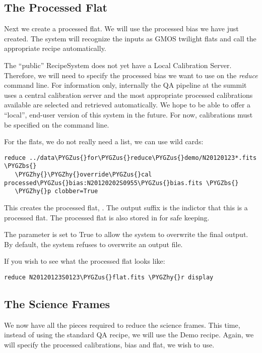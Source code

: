 \documentclass[letterpaper,10pt,english]{sphinxmanual}
\def\PYGZbs{\char`\\}
\def\PYGZus{\char`\_}
\def\PYGZhy{\char`\-}
\begin{document}
\subsection{The Processed Flat}
\label{appendices/appendix_demo:the-processed-flat}
Next we create a processed flat.  We will use the processed bias we have
just created.  The system will recognize the inputs as GMOS twilight flats and
call the appropriate recipe automatically.

The ``public'' RecipeSystem does not yet have a Local Calibration Server.  Therefore,
we will need to specify the processed bias we want to use on the \emph{reduce} command
line.  For information only, internally the QA pipeline at the summit uses a
central calibration server and the most appropriate processed calibrations available
are selected and retrieved automatically.  We hope to be able to offer a ``local'',
end-user version of this system in the future.  For now, calibrations must be
specified on the command line.

For the flats, we do not really need a list, we can use wild cards:

\begin{Verbatim}[commandchars=\\\{\}]
reduce ../data\PYGZus{}for\PYGZus{}reduce\PYGZus{}demo/N20120123*.fits \PYGZbs{}
   \PYGZhy{}\PYGZhy{}override\PYGZus{}cal processed\PYGZus{}bias:N20120202S0955\PYGZus{}bias.fits \PYGZbs{}
   \PYGZhy{}p clobber=True
\end{Verbatim}

This creates the processed flat, .  The output suffix
 is the indictor that this is a processed flat.  The processed flat is also
stored in  for safe keeping.

The  parameter is set to True to allow the system to overwrite the final
output.  By default, the system refuses to overwrite an output file.

If you wish to see what the processed flat looks like:

\begin{Verbatim}[commandchars=\\\{\}]
reduce N20120123S0123\PYGZus{}flat.fits \PYGZhy{}r display
\end{Verbatim}


\subsection{The Science Frames}
\label{appendices/appendix_demo:the-science-frames}
We now have all the pieces required to reduce the science frames.  This time,
instead of using the standard QA recipe, we will use the Demo recipe.  Again,
we will specify the processed calibrations, bias and flat, we wish to use.
\end{document}
